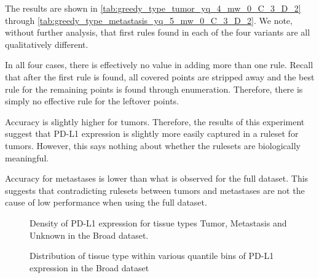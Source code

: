 The results are shown in \autoref{tab:greedy_type_tumor_yq_4_mw_0_C_3_D_2} through
\autoref{tab:greedy_type_metastasis_yq_5_mw_0_C_3_D_2}.
We note, without further analysis,
that first rules found in each of the four variants are all qualitatively different.

In all four cases, there is effectively no value in adding more than one rule.
Recall that after the first rule is found, all covered points are stripped away and the best rule for the remaining points
is found through enumeration.
Therefore, there is simply no effective rule for the leftover points.

Accuracy is slightly higher for tumors.
Therefore, the results of this experiment suggest that
PD-L1 expression is slightly more easily captured in a ruleset for tumors.
However, this says nothing about whether the rulesets are biologically meaningful.

Accuracy for metastases is lower than what is observed for the full dataset.
This suggests that contradicting rulesets between tumors and metastases are not the cause of low performance when using the full dataset.



\begin{figure}[h!]
    \centering
    
    \caption{Density of PD-L1 expression for tissue types Tumor, Metastasis and Unknown in the Broad dataset.}
    \label{fig:tissue_status_density_broad}
\end{figure}


\begin{figure}[h!]
    \centering
    
    \caption{Distribution of tissue type within various quantile bins of PD-L1 expression in the Broad dataset}
    \label{fig:tissue_status_quantile_broad}
\end{figure}

\clearpage

\vspace*{\fill}
\begin{table}[h]
    \centering
    \caption{Results of the greedy method for tumors, $Q_y = 0.5$.}
    \label{tab:greedy_type_tumor_yq_4_mw_0_C_3_D_2}
\end{table}

\begin{table}[h]
    \centering
    \caption{Results of the greedy method for tumors, $Q_y = 0.6$.}
    \label{tab:greedy_type_tumor_yq_5_mw_0_C_3_D_2}
\end{table}
\vspace*{\fill}

